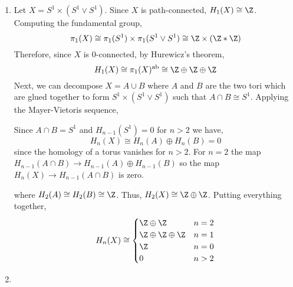 \documentclass[12pt]{extarticle}
\begin{document}
\begin{enumerate}
\item Let $X = S^1 \times (S^1 \vee S^1)$. Since $X$ is path-connected, $H_1(X) \cong \Z$. Computing the fundamental group,
\[ \pi_1(X) \cong \pi_1(S^1) \times \pi_1(S^1 \vee S^1) \cong \Z \times (\Z * \Z) \] 
Therefore, since $X$ is $0$-connected, by Hurewicz's theorem,
\[ H_1(X) \cong \pi_1(X)^{\text{ab}} \cong \Z \oplus \Z \oplus \Z \]
Next, we can decompose $X = A \cup B$ where $A$ and $B$ are the two tori which are glued together to form $S^1 \times (S^1 \vee S^1)$ such that $A \cap B \cong S^1$. Applying the Mayer-Vietoris sequence,
\begin{center}
\end{center}
Since $A \cap B = S^1$ and $H_{n-1}(S^1) = 0$ for $n > 2$ we have,
\[ H_n(X) \cong H_n(A) \oplus H_n(B) = 0 \]
since the homology of a torus vanishes for $n > 2$. For $n = 2$ the map $H_{n-1}(A \cap B) \to H_{n-1}(A) \oplus H_{n-1}(B)$ so the map $H_n(X) \to H_{n-1}(A \cap B)$ is zero. 
\begin{center}
\end{center}
where $H_2(A) \cong H_2(B) \cong \Z$. 
Thus, $H_2(X) \cong \Z \oplus \Z$. Putting everything together,
\[ 
H_n(X) \cong 
\begin{cases}
\Z \oplus \Z & n = 2 
\\ 
\Z \oplus \Z \oplus \Z & n = 1 
\\
\Z & n = 0
\\
0 & n > 2
\end{cases}
\]
\newpage

\item

\newpage



\end{enumerate}
\end{document}
